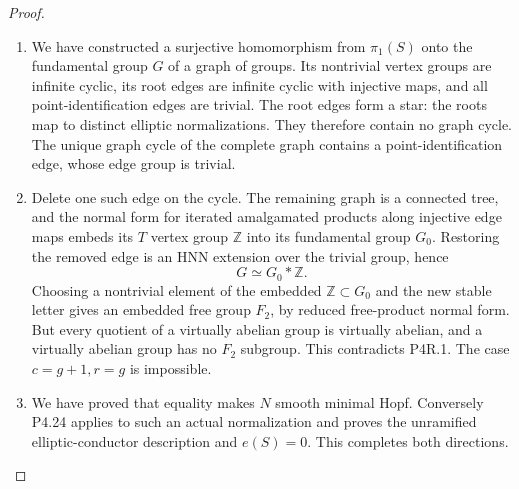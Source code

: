 \begin{proof}
\begin{enumerate}[label={$\langle1\rangle$\arabic*.},leftmargin=*]
\item We have constructed a surjective homomorphism from \(\pi_1(S)\) onto the
fundamental group \(G\) of a graph of groups. Its nontrivial vertex groups
are infinite cyclic, its root edges are infinite cyclic with injective
maps, and all point-identification edges are trivial. The root edges
form a star: the roots map to distinct elliptic normalizations. They
therefore contain no graph cycle. The unique graph cycle of the complete
graph contains a point-identification edge, whose edge group is trivial.

\item Delete one such edge on the cycle. The remaining graph is a connected
tree, and the normal form for iterated amalgamated products along
injective edge maps embeds its \(T\) vertex group \(\mathbb Z\) into its
fundamental group \(G_0\). Restoring the removed edge is an HNN extension
over the trivial group, hence
\[
 G\simeq G_0*\mathbb Z.
\]
Choosing a nontrivial element of the embedded \(\mathbb Z\subset G_0\)
and the new stable letter gives an embedded free group \(F_2\), by reduced
free-product normal form. But every quotient of a virtually abelian group
is virtually abelian, and a virtually abelian group has no \(F_2\)
subgroup. This contradicts P4R.1. The case \(c=g+1,r=g\) is impossible.

\item We have proved that equality makes \(N\) smooth minimal Hopf. Conversely
P4.24 applies to such an actual normalization and proves the unramified
elliptic-conductor description and \(e(S)=0\). This completes both
directions.

\end{enumerate}
\end{proof}
